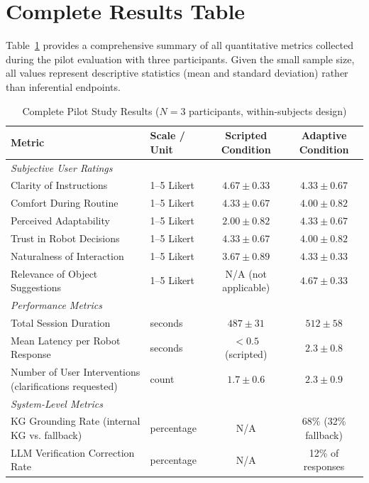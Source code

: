 \appendix

\section{Complete Results Table}
\label{appendix:results_table}

Table~\ref{tab:complete_results} provides a comprehensive summary of all quantitative metrics collected during the pilot evaluation with three participants. Given the small sample size, all values represent descriptive statistics (mean and standard deviation) rather than inferential endpoints.

\begin{table}[!h]
\centering
\caption{Complete Pilot Study Results ($N=3$ participants, within-subjects design)}
\label{tab:complete_results}
\setlength{\tabcolsep}{8pt}
\begin{tabular}{llcc}
\toprule
\textbf{Metric} & \textbf{Scale / Unit} & \textbf{Scripted Condition} & \textbf{Adaptive Condition} \\
\midrule
\multicolumn{4}{l}{\textit{Subjective User Ratings}} \\
Clarity of Instructions & 1--5 Likert & $4.67 \pm 0.33$ & $4.33 \pm 0.67$ \\
Comfort During Routine & 1--5 Likert & $4.33 \pm 0.67$ & $4.00 \pm 0.82$ \\
Perceived Adaptability & 1--5 Likert & $2.00 \pm 0.82$ & $4.33 \pm 0.67$ \\
Trust in Robot Decisions & 1--5 Likert & $4.33 \pm 0.67$ & $4.00 \pm 0.82$ \\
Naturalness of Interaction & 1--5 Likert & $3.67 \pm 0.89$ & $4.33 \pm 0.33$ \\
Relevance of Object Suggestions & 1--5 Likert & N/A (not applicable) & $4.67 \pm 0.33$ \\
\midrule
\multicolumn{4}{l}{\textit{Performance Metrics}} \\
Total Session Duration & seconds & $487 \pm 31$ & $512 \pm 58$ \\
Mean Latency per Robot Response & seconds & $<0.5$ (scripted) & $2.3 \pm 0.8$ \\
Number of User Interventions (clarifications requested) & count & $1.7 \pm 0.6$ & $2.3 \pm 0.9$ \\
\midrule
\multicolumn{4}{l}{\textit{System-Level Metrics}} \\
KG Grounding Rate (internal KG vs. fallback) & percentage & N/A & 68\% (32\% fallback) \\
LLM Verification Correction Rate & percentage & N/A & 12\% of responses \\

\end{tabular}
\end{table}
